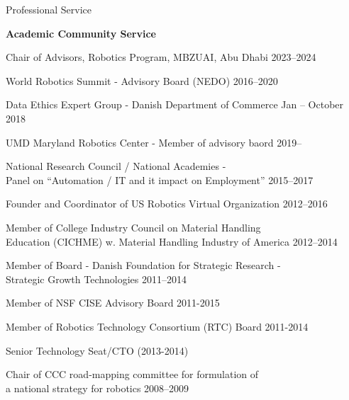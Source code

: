 \documentclass{article}
\newenvironment{sublist}{%
  \begin{list}{}{%
      \setlength{\itemsep}{0em}\setlength{\parsep}{0em}%
      \setlength{\topsep}{0em}\setlength{\parskip}{0em}%
    }%
}%
{ \end{list} }
\begin{document}
\begin{cv}


\begin{cvlist}{Professional Service}%
\item {\bf Academic Community Service}
  \begin{itemize}
    \item Chair of Advisors, Robotics Program, MBZUAI, Abu Dhabi
          \cftdotfill{\cftdotsep} 2023--2024
    \item World Robotics Summit - Advisory Board (NEDO) \cftdotfill{\cftdotsep}
          2016--2020
    \item Data Ethics Expert Group - Danish Department of Commerce
          \cftdotfill{\cftdotsep} Jan -- October 2018
    \item UMD Maryland Robotics Center - Member of advisory baord
          \cftdotfill{\cftdotsep} 2019--
    \item National Research Council / National Academies -\\ Panel on ``Automation /
          IT and it impact on Employment'' \cftdotfill{\cftdotsep} 2015--2017
    \item Founder and Coordinator of US Robotics Virtual Organization
          \cftdotfill{\cftdotsep} 2012--2016
    \item Member of College Industry Council on Material Handling\\
          Education (CICHME) w. Material Handling Industry of America
          \cftdotfill{\cftdotsep} 2012--2014
    \item Member of Board - Danish Foundation for Strategic Research -\\
          Strategic Growth Technologies \cftdotfill{\cftdotsep} 2011--2014
    \item Member of NSF CISE Advisory Board \cftdotfill{\cftdotsep} 2011-2015
    \item Member of Robotics Technology Consortium (RTC) Board
          \cftdotfill{\cftdotsep} 2011-2014
          \begin{sublist}
            \item Senior Technology Seat/CTO (2013-2014)
          \end{sublist}
    \item Chair of CCC road-mapping committee for formulation of \\
          a national strategy for robotics \cftdotfill{\cftdotsep} 2008--2009

\end{itemize}
\end{cvlist}
\end{cv}
\end{document}
